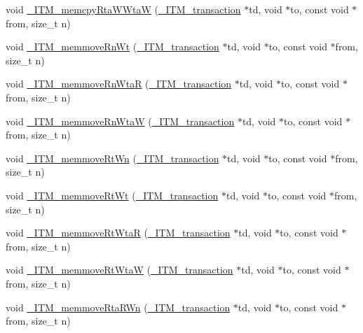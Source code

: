 \begin{DoxyCompactItemize}
\item 
void \hyperlink{libitm-5_813_0014_8cpp_a07c938b7a808cfc49f83b12aa5535b30}{\-\_\-\-I\-T\-M\-\_\-memcpy\-Rta\-W\-Wta\-W} (\hyperlink{libitm_8h_a65d3a93d285fdbde408558d6b431abc8}{\-\_\-\-I\-T\-M\-\_\-transaction} $\ast$td, void $\ast$to, const void $\ast$from, size\-\_\-t n)
\item 
void \hyperlink{libitm-5_813_0014_8cpp_a34cba8048205d01fe750a62775d02bf7}{\-\_\-\-I\-T\-M\-\_\-memmove\-Rn\-Wt} (\hyperlink{libitm_8h_a65d3a93d285fdbde408558d6b431abc8}{\-\_\-\-I\-T\-M\-\_\-transaction} $\ast$td, void $\ast$to, const void $\ast$from, size\-\_\-t n)
\item 
void \hyperlink{libitm-5_813_0014_8cpp_a7d920991e40a91c39a52e819cc2ace72}{\-\_\-\-I\-T\-M\-\_\-memmove\-Rn\-Wta\-R} (\hyperlink{libitm_8h_a65d3a93d285fdbde408558d6b431abc8}{\-\_\-\-I\-T\-M\-\_\-transaction} $\ast$td, void $\ast$to, const void $\ast$from, size\-\_\-t n)
\item 
void \hyperlink{libitm-5_813_0014_8cpp_a4c22cab147daa561788cd63ec8bed1ed}{\-\_\-\-I\-T\-M\-\_\-memmove\-Rn\-Wta\-W} (\hyperlink{libitm_8h_a65d3a93d285fdbde408558d6b431abc8}{\-\_\-\-I\-T\-M\-\_\-transaction} $\ast$td, void $\ast$to, const void $\ast$from, size\-\_\-t n)
\item 
void \hyperlink{libitm-5_813_0014_8cpp_a3275cf58741d8a8a15af2bf7f4cb0a6f}{\-\_\-\-I\-T\-M\-\_\-memmove\-Rt\-Wn} (\hyperlink{libitm_8h_a65d3a93d285fdbde408558d6b431abc8}{\-\_\-\-I\-T\-M\-\_\-transaction} $\ast$td, void $\ast$to, const void $\ast$from, size\-\_\-t n)
\item 
void \hyperlink{libitm-5_813_0014_8cpp_a57220a8b505e83c0f5123a4e1079262f}{\-\_\-\-I\-T\-M\-\_\-memmove\-Rt\-Wt} (\hyperlink{libitm_8h_a65d3a93d285fdbde408558d6b431abc8}{\-\_\-\-I\-T\-M\-\_\-transaction} $\ast$td, void $\ast$to, const void $\ast$from, size\-\_\-t n)
\item 
void \hyperlink{libitm-5_813_0014_8cpp_af41f7bad3329219dd2a4c353312955c2}{\-\_\-\-I\-T\-M\-\_\-memmove\-Rt\-Wta\-R} (\hyperlink{libitm_8h_a65d3a93d285fdbde408558d6b431abc8}{\-\_\-\-I\-T\-M\-\_\-transaction} $\ast$td, void $\ast$to, const void $\ast$from, size\-\_\-t n)
\item 
void \hyperlink{libitm-5_813_0014_8cpp_a2acd7d043bcdf7e43975c7f31df9af89}{\-\_\-\-I\-T\-M\-\_\-memmove\-Rt\-Wta\-W} (\hyperlink{libitm_8h_a65d3a93d285fdbde408558d6b431abc8}{\-\_\-\-I\-T\-M\-\_\-transaction} $\ast$td, void $\ast$to, const void $\ast$from, size\-\_\-t n)
\item 
void \hyperlink{libitm-5_813_0014_8cpp_a30774784741bc966fdc1d48f0b49c14e}{\-\_\-\-I\-T\-M\-\_\-memmove\-Rta\-R\-Wn} (\hyperlink{libitm_8h_a65d3a93d285fdbde408558d6b431abc8}{\-\_\-\-I\-T\-M\-\_\-transaction} $\ast$td, void $\ast$to, const void $\ast$from, size\-\_\-t n)

\end{DoxyCompactItemize}
